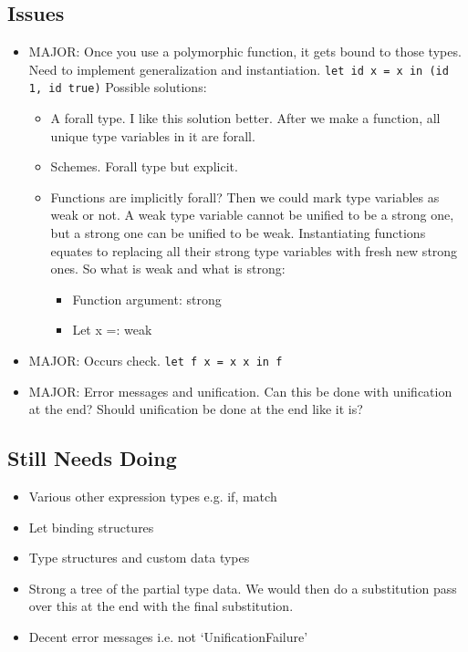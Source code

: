 \documentclass{report}
\newcommand{\camlinline}{\texttt}
\begin{document}
\subsection{Issues}
\begin{itemize}
	\item MAJOR: Once you use a polymorphic function, it gets bound to those types. Need to implement generalization and instantiation. \camlinline{let id x = x in (id 1, id true)} Possible solutions:
	\begin{itemize}
		\item A forall type. I like this solution better. After we make a function, all unique type variables in it are forall.
		\item Schemes. Forall type but explicit.
		\item Functions are implicitly forall? Then we could mark type variables as weak or not. A weak type variable cannot be unified to be a strong one, but a strong one can be unified to be weak. Instantiating functions equates to replacing all their strong type variables with fresh new strong ones. So what is weak and what is strong:
		\begin{itemize}
			\item Function argument: strong
			\item Let x =: weak
		\end{itemize}
	\end{itemize}
    \item MAJOR: Occurs check. \camlinline{let f x = x x in f}
    \item MAJOR: Error messages and unification. Can this be done with unification at the end? Should unification be done at the end like it is?
\end{itemize}

\subsection{Still Needs Doing}
\begin{itemize}
	\item Various other expression types e.g. if, match
	\item Let binding structures
	\item Type structures and custom data types
	\item Strong a tree of the partial type data. We would then do a substitution pass over this at the end with the final substitution.
	\item Decent error messages i.e. not `UnificationFailure'
\end{itemize}
\end{document}
